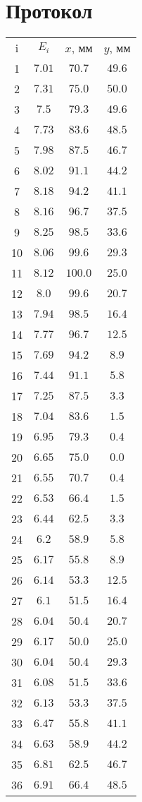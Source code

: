 \section*{Протокол}

\begin{tabular}{cccc}
	i & $ E_i  $ & $ x $, мм & $ y $, мм \\
	1 & $ 7.01 $ & $ 70.7 $ & $ 49.6 $ \\
	2 & $ 7.31 $ & $ 75.0 $ & $ 50.0 $ \\
	3 & $ 7.5 $ & $ 79.3 $ & $ 49.6 $ \\
	4 & $ 7.73 $ & $ 83.6 $ & $ 48.5 $ \\
	5 & $ 7.98 $ & $ 87.5 $ & $ 46.7 $ \\
	6 & $ 8.02 $ & $ 91.1 $ & $ 44.2 $ \\
	7 & $ 8.18 $ & $ 94.2 $ & $ 41.1 $ \\
	8 & $ 8.16 $ & $ 96.7 $ & $ 37.5 $ \\
	9 & $ 8.25 $ & $ 98.5 $ & $ 33.6 $ \\
	10 & $ 8.06 $ & $ 99.6 $ & $ 29.3 $ \\
	11 & $ 8.12 $ & $ 100.0 $ & $ 25.0 $ \\
	12 & $ 8.0 $ & $ 99.6 $ & $ 20.7 $ \\
	13 & $ 7.94 $ & $ 98.5 $ & $ 16.4 $ \\
	14 & $ 7.77 $ & $ 96.7 $ & $ 12.5 $ \\
	15 & $ 7.69 $ & $ 94.2 $ & $ 8.9 $ \\
	16 & $ 7.44 $ & $ 91.1 $ & $ 5.8 $ \\
	17 & $ 7.25 $ & $ 87.5 $ & $ 3.3 $ \\
	18 & $ 7.04 $ & $ 83.6 $ & $ 1.5 $ \\
	19 & $ 6.95 $ & $ 79.3 $ & $ 0.4 $ \\
	20 & $ 6.65 $ & $ 75.0 $ & $ 0.0 $ \\
	21 & $ 6.55 $ & $ 70.7 $ & $ 0.4 $ \\
	22 & $ 6.53 $ & $ 66.4 $ & $ 1.5 $ \\
	23 & $ 6.44 $ & $ 62.5 $ & $ 3.3 $ \\
	24 & $ 6.2 $ & $ 58.9 $ & $ 5.8 $ \\
	25 & $ 6.17 $ & $ 55.8 $ & $ 8.9 $ \\
	26 & $ 6.14 $ & $ 53.3 $ & $ 12.5 $ \\
	27 & $ 6.1 $ & $ 51.5 $ & $ 16.4 $ \\
	28 & $ 6.04 $ & $ 50.4 $ & $ 20.7 $ \\
	29 & $ 6.17 $ & $ 50.0 $ & $ 25.0 $ \\
	30 & $ 6.04 $ & $ 50.4 $ & $ 29.3 $ \\
	31 & $ 6.08 $ & $ 51.5 $ & $ 33.6 $ \\
	32 & $ 6.13 $ & $ 53.3 $ & $ 37.5 $ \\
	33 & $ 6.47 $ & $ 55.8 $ & $ 41.1 $ \\
	34 & $ 6.63 $ & $ 58.9 $ & $ 44.2 $ \\
	35 & $ 6.81 $ & $ 62.5 $ & $ 46.7 $ \\
	36 & $ 6.91 $ & $ 66.4 $ & $ 48.5 $ \\ 	
\end{tabular}
